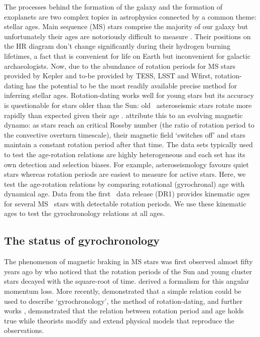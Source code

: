 The processes behind the formation of the galaxy and the formation of
exoplanets are two complex topics in astrophysics connected by a common theme:
stellar ages.
Main sequence (MS) stars comprise the majority of our galaxy but unfortunately
their ages are notoriously difficult to measure \citep[see][for a
review]{Soderblom2010}.
Their positions on the HR diagram don't change significantly during their
hydrogen burning lifetimes, a fact that is convenient for life on Earth but
inconvenient for galactic archaeologists.
Now, due to the abundance of rotation periods for MS stars provided by Kepler
and to-be provided by TESS, LSST and Wfirst, rotation-dating has the potential
to be the most readily available precise method for inferring stellar ages.
Rotation-dating works well for young stars but its accuracy is questionable
for stars older than the Sun: old \kepler\ asteroseismic stars rotate more
rapidly than expected given their age \citep{Angus2015, Vansaders2016,
Metcalfe2016}.
\citet{Vansaders2016} attribute this to an evolving magnetic dynamo: as stars
reach an critical Rossby number (the ratio of rotation period to the
convective overturn timescale), their magnetic field `switches off' and stars
maintain a constant rotation period after that time.
The data sets typically used to test the age-rotation relations are highly
heterogeneous and each set has its own detection and selection biases.
For example, asteroseismology favours quiet stars whereas rotation periods are
easiest to measure for active stars.
Here, we test the age-rotation relations by comparing rotational (gyrochronal)
age with dynamical age.
Data from the first \Gaia\ data release (DR1) provides kinematic ages for
several MS \Kepler\ stars with detectable rotation periods.
We use these kinematic ages to test the gyrochronology relations at all ages.

\subsection{The status of gyrochronology}
The phenomenon of magnetic braking in MS stars was first observed almost fifty
years ago by \citet{Skumanich1972} who noticed that the rotation periods of
the Sun and young cluster stars decayed with the square-root of time.
\citet{Kawaler1988} derived a formalism for this angular momentum loss.
More recently, \citet{Barnes2003} demonstrated that a simple relation could be
used to describe `gyrochronology', the method of rotation-dating, and further
works \citep[\eg][]{Barnes2007, Mamajek2008, Barnes2010, Meibom2011},
demonstrated that the relation between rotation period and age holds true
while theorists \citep[\eg][]{Matt2012, Epstein2014, Vansaders2013,
Vansaders2015} modify and extend physical models that reproduce the
observations.


